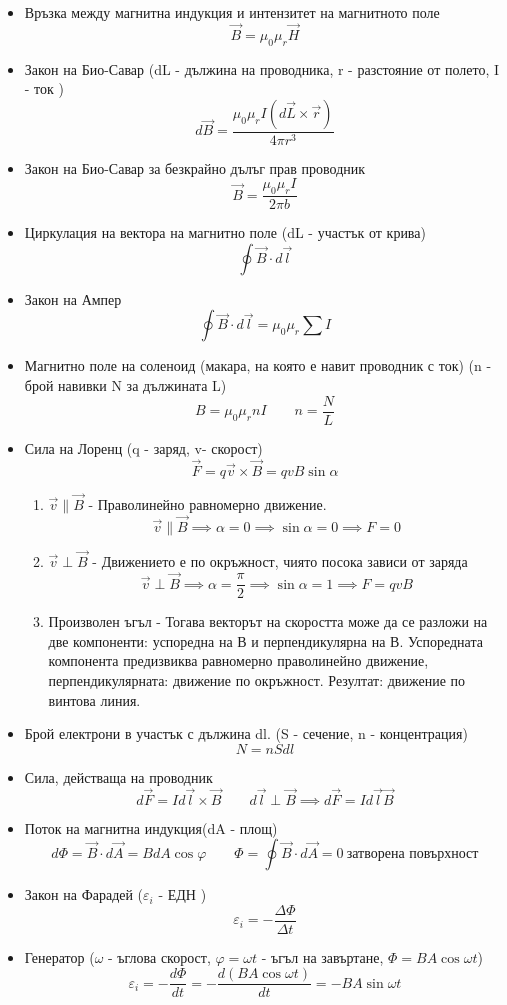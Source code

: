 \documentclass[fleqn, 12pt]{article}
\theoremstyle{definition}
\begin{document}
\begin{itemize}
\item Връзка между магнитна индукция и интензитет на магнитното поле
$$\vec{B} = \mu_0 \mu_r \vec{H}$$
\item Закон на Био-Савар (dL - дължина на проводника, r - разстояние от полето, I - ток )
$$d\vec{B} = \frac{\mu_0 \mu_r I(d\vec{L} \times \vec{r})}{4 \pi r^3}$$
\item Закон на Био-Савар за безкрайно дълъг прав проводник
$$\vec{B} = \frac{\mu_0 \mu_r I}{2 \pi b}$$
\item Циркулация на вектора на магнитно поле (dL - участък от крива)
$$\oint \vec{B} \cdot d\vec{l}$$
\item Закон на Ампер
$$\oint \vec{B} \cdot d\vec{l} = \mu_0 \mu_r \sum I$$
\item Магнитно поле на соленоид (макара, на която е навит проводник с ток) (n - брой навивки N за дължината L)
$$B = \mu_0 \mu_r nI \qquad n = \frac{N}{L}$$
\item Сила на Лоренц (q - заряд, v- скорост)
$$\vec{F} = q\vec{v} \times \vec{B} = qvB\sin\alpha$$
\begin{enumerate}
\item $\vec{v} \parallel \vec{B}$ -  Праволинейно равномерно движение. 
$$\vec{v} \parallel \vec{B} \implies \alpha = 0 \implies \sin\alpha = 0 \implies F = 0$$
\item $\vec{v} \perp \vec{B}$ - Движението е по окръжност, чиято посока зависи от заряда
$$\vec{v} \perp \vec{B} \implies \alpha = \frac{\pi}{2} \implies \sin\alpha = 1 \implies F = qvB$$
\item Произволен ъгъл - 
Тогава векторът на скоростта може да се разложи
на две компоненти: успоредна на В и
перпендикулярна на В. Успоредната
компонента предизвиква равномерно
праволинейно движение,
перпендикулярната: движение по
окръжност. Резултат: движение по
винтова линия.
\end{enumerate}
\item Брой електрони в участък с дължина dl. (S - сечение, n - концентрация)
$$N = nSdl$$
\item Сила, действаща на проводник
$$d\vec{F} = I d\vec{l} \times \vec{B} \qquad  d\vec{l} \perp \vec{B} \implies d\vec{F} = I d\vec{l}\vec{B}$$
\item Поток на магнитна индукция(dA - площ)
$$d \Phi = \vec{B} \cdot d\vec{A} = BdA \cos \varphi \qquad \Phi = \oint \vec{B} \cdot d\vec{A} = 0 \ \text{затворена повърхност}$$
\item Закон на Фарадей ($\varepsilon_i$ - ЕДН )
$$\varepsilon_i = - \frac{\Delta \Phi}{\Delta t}$$
\item Генератор ($\omega$ - ъглова скорост, $\varphi = \omega t$ - ъгъл на завъртане, $\Phi = BA\cos\omega t$)
$$\varepsilon_i = - \frac{d\Phi}{dt} = - \frac{d(BA\cos\omega t)}{dt} = -BA\sin\omega t $$
\end{itemize}
\end{document}
